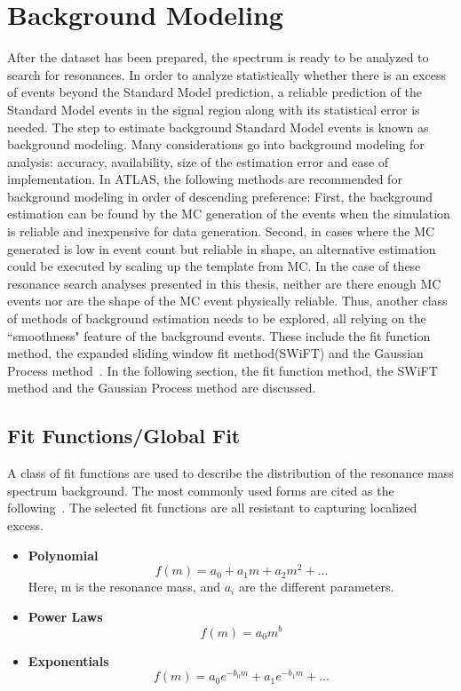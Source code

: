 \section{Background Modeling}
\label{sec:backgroundest}
After the dataset has been prepared, the spectrum is ready to be analyzed to search for resonances. In order to analyze statistically whether there is an excess of events beyond the Standard Model prediction, a reliable prediction of the Standard Model events in the signal region along with its statistical error is needed. The step to estimate background Standard Model events is known as background modeling.
Many considerations go into background modeling for analysis: accuracy, availability, size of the estimation error and ease of implementation. In ATLAS, the following methods are recommended for background modeling in order of descending preference:
    First, the background estimation can be found by the MC generation of the events when the simulation is reliable and inexpensive for data generation. Second, in cases where the MC generated is low in event count but reliable in shape, an alternative estimation could be executed by scaling up the template from MC. In the case of these resonance search analyses presented in this thesis, neither are there enough MC events nor are the shape of the MC event physically reliable. Thus, another class of methods of background estimation needs to be explored, all relying on the ``smoothness" feature of the background events. These include the fit function method, the expanded sliding window fit method(SWiFT) and the Gaussian Process method~\cite{frate2017modeling}.
    In the following section, the fit function method, the SWiFT method and the Gaussian Process method are discussed.

\subsection{Fit Functions/Global Fit}
\label{sec:fitfunction}
A class of fit functions are used to describe the distribution of the resonance mass spectrum background. The most commonly used forms are cited as the following~\cite{ATL-PHYS-PUB-2020-028}. The selected fit functions are all resistant to capturing localized excess.

    \begin{itemize}

    \item \textbf{Polynomial}
        \begin{equation}
            f(m)= a_0 + a_{1}m + a_{2}m^{2}+...
        \end{equation} Here, m is the resonance mass, and $a_{i}$ are the different parameters.
    \item \textbf{Power Laws}
        \begin{equation}
            f(m)= a_{0}m^{b}
        \end{equation}

    \item \textbf{Exponentials}
        \begin{equation}
            f(m) = a_{0}e^{-b_{0}m} +a_{1}e^{-b_{1}m}+...
        \end{equation}
    \end{itemize}

